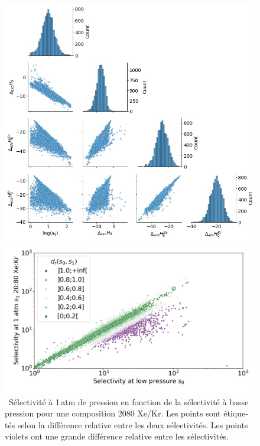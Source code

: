 \documentclass[thesis]{subfiles}
\begin{document}
\begin{otherlanguage}{french}
\begin{figure}[h]
\begin{minipage}[t]{.43\textwidth}
\centering
  \includegraphics[width=\linewidth]{figures/2-thermo/Enthalpy_0_log.jpg}
  \caption{\small{\ Pour 8\,401 MOFs avec une sélectivité Xe/Kr favorable ($s\e{0} > 1$), pair-plots entre les différentes grandeurs $\log(s\e{0})$, $\Delta\e{exc}H\e{0}$, $\Delta\e{ads}H\ex{Xe}\e{0}$ et $\Delta\e{ads}H\ex{Kr}\e{0}$ (les enthalpies sont en \si{\kilo\joule\per\mol}) en dehors de la diagonale et la distribution de chaque grandeur sur la diagonale.}}
  \label{fgr:histo_H_resume}
\end{minipage}
\hfill
\begin{minipage}[t]{.5\textwidth}
\centering
  \includegraphics[width=\linewidth]{figures/2-thermo/s_0_vs_s_2080_overview_log.jpg}
  \caption{\small{\ Sélectivité à 1\,atm de pression en fonction de la sélectivité à basse pression pour une composition 20\pp{}80 Xe/Kr. Les points sont étiquetés selon la différence relative entre les deux sélectivités. Les points violets ont une grande différence relative entre les sélectivités. }}
  \label{fgr:overview_resume}
\end{minipage}
\end{figure}


\end{otherlanguage}
\end{document}
